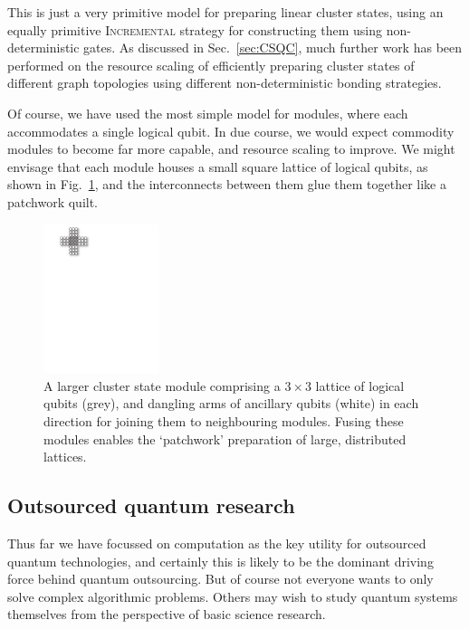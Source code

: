 This is just a very primitive model for preparing linear cluster states, using an equally primitive \textsc{Incremental} strategy for constructing them using non-deterministic gates. As discussed in Sec.~\ref{sec:CSQC}, much further work has been performed on the resource scaling of efficiently preparing cluster states of different graph topologies using different non-deterministic bonding strategies.

Of course, we have used the most simple model for modules, where each accommodates a single logical qubit. In due course, we would expect commodity modules to become far more capable, and resource scaling to improve. We might envisage that each module houses a small square lattice of logical qubits, as shown in Fig.~\ref{fig:larger_module}, and the interconnects between them glue them together like a patchwork quilt.

\begin{figure}[htpb]
\includegraphics[width=0.3\textwidth]{larger_module}
\caption{A larger cluster state module comprising a \mbox{$3\times 3$} lattice of logical qubits (grey), and dangling arms of ancillary qubits (white) in each direction for joining them to neighbouring modules. Fusing these modules enables the `patchwork' preparation of large, distributed lattices.} \label{fig:larger_module}
\end{figure}

%
%

\subsection{Outsourced quantum research} 

Thus far we have focussed on computation as the key utility for outsourced quantum technologies, and certainly this is likely to be the dominant driving force behind quantum outsourcing. But of course not everyone wants to only solve complex algorithmic problems. Others may wish to study quantum systems themselves from the perspective of basic science research.

